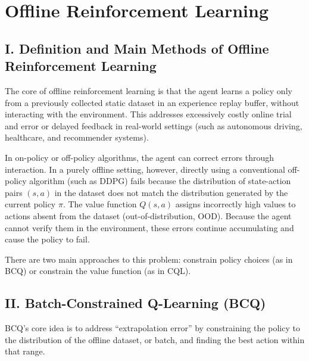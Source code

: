 \setcounter{section}{2}

\hypertarget{offline-reinforcement-learning}{%
\section{Offline Reinforcement Learning}\label{offline-reinforcement-learning}}

\hypertarget{i.-definition-and-main-methods-of-offline-reinforcement-learning}{%
\subsection{I. Definition and Main Methods of Offline Reinforcement Learning}\label{i.-definition-and-main-methods-of-offline-reinforcement-learning}}

The core of offline reinforcement learning is that the agent learns a policy only from a previously collected static dataset in an experience replay buffer, without interacting with the environment. This addresses excessively costly online trial and error or delayed feedback in real-world settings (such as autonomous driving, healthcare, and recommender systems).

In on-policy or off-policy algorithms, the agent can correct errors through interaction. In a purely offline setting, however, directly using a conventional off-policy algorithm (such as DDPG) fails because the distribution of state-action pairs \((s,a)\) in the dataset does not match the distribution generated by the current policy \(\pi\). The value function \(Q(s,a)\) assigns incorrectly high values to actions absent from the dataset (out-of-distribution, OOD). Because the agent cannot verify them in the environment, these errors continue accumulating and cause the policy to fail.

There are two main approaches to this problem: constrain policy choices (as in BCQ) or constrain the value function (as in CQL).

\hypertarget{ii.-batch-constrained-q-learning-bcq}{%
\subsection{II. Batch-Constrained Q-Learning (BCQ)}\label{ii.-batch-constrained-q-learning-bcq}}

BCQ's core idea is to address ``extrapolation error'' by constraining the policy to the distribution of the offline dataset, or batch, and finding the best action within that range.


